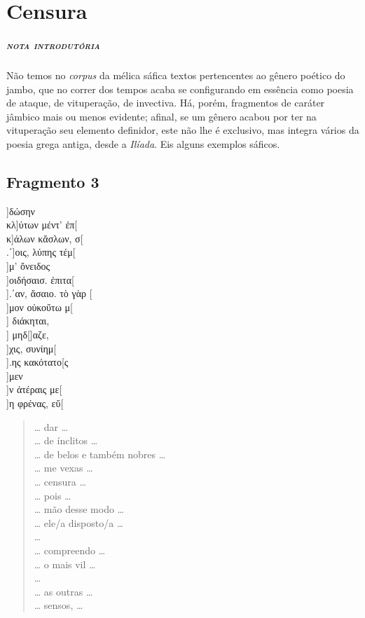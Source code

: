 \chapter{Censura}

\paragraph{\textsc{nota introdutória}}
Não temos no \textit{corpus }da mélica sáfica textos pertencentes ao gênero
poético do jambo, que no correr dos tempos acaba se configurando em essência como poesia de
ataque, de vituperação, de invectiva. Há, porém,
fragmentos de caráter jâmbico mais ou menos evidente; afinal, se um gênero
acabou por ter na vituperação seu elemento definidor, este não lhe é exclusivo,
mas integra vários da poesia grega antiga, desde a \textit{Ilíada}. Eis
alguns exemplos sáficos.

\section{Fragmento 3} 

\begin{gkverse}
]δώσην\\
κλ]ύτων μέντ’ ἐπ[\\
κ]άλων κἄσλων, σ[\\
.΄]οις, λύπης τέμ[\\
 ]μ’ ὄνειδος\\
]οιδήσαισ. ἐπιτα[\\
].΄αν, ἄσαιο. τὸ γὰρ [\\
]μον οὐκοὔτω μ[\\
] διάκηται,\\
  ] μηδ[\qquad    ]αζε,\\
  ]χις, συνίημ[\\ 
].ης κακότατο[ς\\
  ]μεν\\
  ]ν ἀτέραις με[\\
]η φρένας, εὔ[
\end{gkverse}
\pagebreak
\begin{verse}
\ldots{} dar \ldots{}\\
\ldots{} de ínclitos \ldots{}\\
\ldots{} de belos e também nobres \ldots{}\\
\ldots{} me vexas \ldots{}\\
\ldots{} censura \ldots{}\\
\ldots{} pois \ldots{}\\
\ldots{} mão desse modo \ldots{}\\
\ldots{} ele/a disposto/a \ldots{}\\
\ldots{}\\
\ldots{} compreendo \ldots{}\\
\ldots{} o mais vil \ldots{}\\
\ldots{}\\
\ldots{} as outras \ldots{}\\
\ldots{} sensos, \ldots{}
\end{verse}

